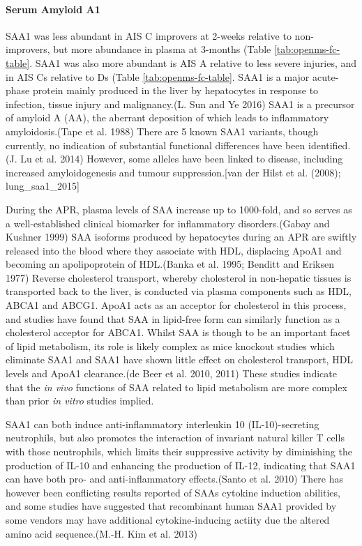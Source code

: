 \documentclass[9pt,lineno]{elife}
\begin{document}
\hypertarget{serum-amyloid-a1}{%
\paragraph{Serum Amyloid A1}\label{serum-amyloid-a1}}

SAA1 was less abundant in AIS C improvers at 2-weeks relative to non-improvers, but more abundance in plasma at 3-months (Table \ref{tab:openms-fc-table}.
SAA1 was also more abundant is AIS A relative to less severe injuries, and in AIS Cs relative to Ds (Table \ref{tab:openms-fc-table}.
SAA1 is a major acute-phase protein mainly produced in the liver by hepatocytes in response to infection, tissue injury and malignancy.(L. Sun and Ye 2016)
SAA1 is a precursor of amyloid A (AA), the aberrant deposition of which leads to inflammatory amyloidosis.(Tape et al. 1988)
There are 5 known SAA1 variants, though currently, no indication of substantial functional differences have been identified.(J. Lu et al. 2014)
However, some alleles have been linked to disease, including increased amyloidogenesis and tumour suppression.{[}van der Hilst et al. (2008); lung\_saa1\_2015{]}

During the APR, plasma levels of SAA increase up to 1000-fold, and so serves as a well-established clinical biomarker for inflammatory disorders.(Gabay and Kushner 1999)
SAA isoforms produced by hepatocytes during an APR are swiftly released into the blood where they associate with HDL, displacing ApoA1 and becoming an apolipoprotein of HDL.(Banka et al. 1995; Benditt and Eriksen 1977)
Reverse cholesterol transport, whereby cholesterol in non-hepatic tissues is transported back to the liver, is conducted via plasma components such as HDL, ABCA1 and ABCG1.
ApoA1 acts as an acceptor for cholesterol in this process, and studies have found that SAA in lipid-free form can similarly function as a cholesterol acceptor for ABCA1.
Whilst SAA is though to be an important facet of lipid metabolism, its role is likely complex as mice knockout studies which eliminate SAA1 and SAA1 have shown little effect on cholesterol transport, HDL levels and ApoA1 clearance.(de Beer et al. 2010, 2011)
These studies indicate that the \emph{in vivo} functions of SAA related to lipid metabolism are more complex than prior \emph{in vitro} studies implied.

SAA1 can both induce anti-inflammatory interleukin 10 (IL-10)-secreting neutrophils, but also promotes the interaction of invariant natural killer T cells with those neutrophils, which limits their suppressive activity by diminishing the production of IL-10 and enhancing the production of IL-12, indicating that SAA1 can have both pro- and anti-inflammatory effects.(Santo et al. 2010)
There has however been conflicting results reported of SAAs cytokine induction abilities, and some studies have suggested that recombinant human SAA1 provided by some vendors may have additional cytokine-inducing actiity due the altered amino acid sequence.(M.-H. Kim et al. 2013)
\end{document}
